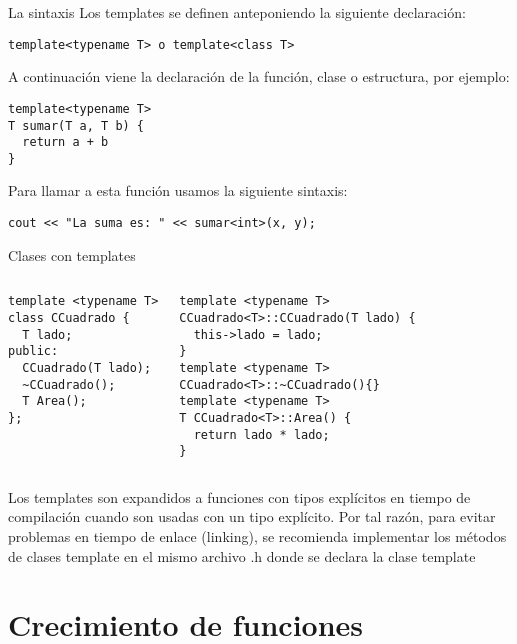 \documentclass[aspectratio=169]{beamer}
\begin{document}
\begin{frame}[fragile]{La sintaxis}
  Los templates se definen anteponiendo la siguiente declaración:
  \begin{lstlisting}
template<typename T> o template<class T>
  \end{lstlisting}
  A continuación viene la declaración de la función, clase o estructura, por ejemplo:
  \begin{lstlisting}
template<typename T>
T sumar(T a, T b) {
  return a + b
}
  \end{lstlisting}
  Para llamar a esta función usamos la siguiente sintaxis:
  \begin{lstlisting}
cout << "La suma es: " << sumar<int>(x, y);
  \end{lstlisting}
\end{frame}

\begin{frame}[fragile]{Clases con templates}
  \begin{columns}
     \begin{lstlisting}
template <typename T>
class CCuadrado {
  T lado;
public:
  CCuadrado(T lado);
  ~CCuadrado();
  T Area();
};
    \end{lstlisting}
     \begin{lstlisting}
template <typename T>
CCuadrado<T>::CCuadrado(T lado) { 
  this->lado = lado;
}
template <typename T>
CCuadrado<T>::~CCuadrado(){}
template <typename T>
T CCuadrado<T>::Area() {
  return lado * lado;
}
    \end{lstlisting}
  \end{columns}
  \alert{Los templates son expandidos a funciones con tipos explícitos en tiempo de compilación cuando son usadas con un tipo explícito. Por tal razón, para evitar problemas en tiempo de enlace (linking), se recomienda implementar los métodos de clases template en el mismo archivo .h donde se declara la clase template}
\end{frame}

\section{Crecimiento de funciones}
\end{document}
